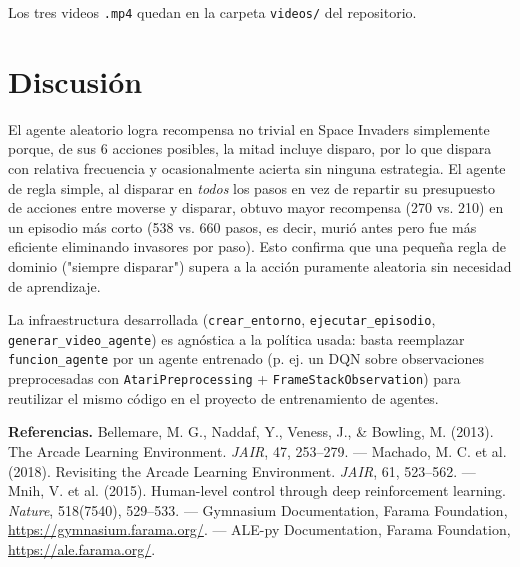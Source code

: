 \documentclass[10pt]{article}
\newcommand{\rhead}[1]{\textbf{#1}}
\begin{document}
Los tres videos \texttt{.mp4} quedan en la carpeta \texttt{videos/} del repositorio.

\section{Discusión}

El agente aleatorio logra recompensa no trivial en Space Invaders simplemente porque, de sus 6 acciones posibles, la mitad incluye disparo, por lo que dispara con relativa frecuencia y ocasionalmente acierta sin ninguna estrategia. El agente de regla simple, al disparar en \emph{todos} los pasos en vez de repartir su presupuesto de acciones entre moverse y disparar, obtuvo mayor recompensa (270 vs. 210) en un episodio más corto (538 vs. 660 pasos, es decir, murió antes pero fue más eficiente eliminando invasores por paso). Esto confirma que una pequeña regla de dominio ("siempre disparar") supera a la acción puramente aleatoria sin necesidad de aprendizaje.

La infraestructura desarrollada (\texttt{crear\_entorno}, \texttt{ejecutar\_episodio}, \texttt{generar\_video\_agente}) es agnóstica a la política usada: basta reemplazar \texttt{funcion\_agente} por un agente entrenado (p. ej. un DQN sobre observaciones preprocesadas con \texttt{AtariPreprocessing} + \texttt{FrameStackObservation}) para reutilizar el mismo código en el proyecto de entrenamiento de agentes.

{\small
\rhead{Referencias.} Bellemare, M. G., Naddaf, Y., Veness, J., \& Bowling, M. (2013). The Arcade Learning Environment. \emph{JAIR}, 47, 253--279. --- Machado, M. C. et al. (2018). Revisiting the Arcade Learning Environment. \emph{JAIR}, 61, 523--562. --- Mnih, V. et al. (2015). Human-level control through deep reinforcement learning. \emph{Nature}, 518(7540), 529--533. --- Gymnasium Documentation, Farama Foundation, \url{https://gymnasium.farama.org/}. --- ALE-py Documentation, Farama Foundation, \url{https://ale.farama.org/}.
}
\end{document}
